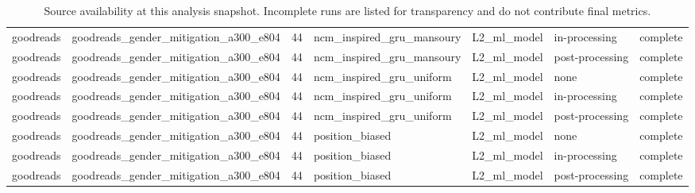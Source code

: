 \begin{table}[htbp!]
\begin{tabular}{llrllll}
goodreads & goodreads\_gender\_mitigation\_a300\_e804 & 44 & ncm\_inspired\_gru\_mansoury & L2\_ml\_model & in-processing & complete \\
goodreads & goodreads\_gender\_mitigation\_a300\_e804 & 44 & ncm\_inspired\_gru\_mansoury & L2\_ml\_model & post-processing & complete \\
goodreads & goodreads\_gender\_mitigation\_a300\_e804 & 44 & ncm\_inspired\_gru\_uniform & L2\_ml\_model & none & complete \\
goodreads & goodreads\_gender\_mitigation\_a300\_e804 & 44 & ncm\_inspired\_gru\_uniform & L2\_ml\_model & in-processing & complete \\
goodreads & goodreads\_gender\_mitigation\_a300\_e804 & 44 & ncm\_inspired\_gru\_uniform & L2\_ml\_model & post-processing & complete \\
goodreads & goodreads\_gender\_mitigation\_a300\_e804 & 44 & position\_biased & L2\_ml\_model & none & complete \\
goodreads & goodreads\_gender\_mitigation\_a300\_e804 & 44 & position\_biased & L2\_ml\_model & in-processing & complete \\
goodreads & goodreads\_gender\_mitigation\_a300\_e804 & 44 & position\_biased & L2\_ml\_model & post-processing & complete \\
\hline
\end{tabular}
\caption{Source availability at this analysis snapshot. Incomplete runs are listed for transparency and do not contribute final metrics.}
\label{chap:results:tab:rq7_source_availability}
\end{table}
